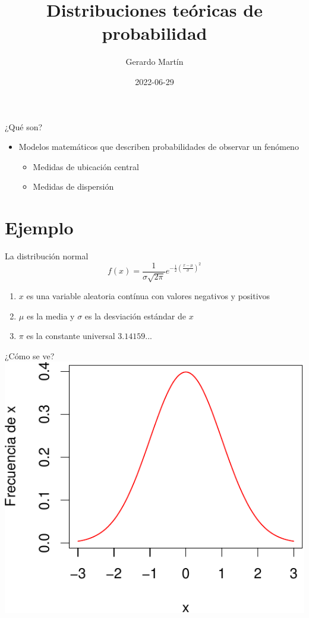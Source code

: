 \documentclass[
  11pt,
  ignorenonframetext,
]{beamer}
\title{Distribuciones teóricas de probabilidad}
\author{Gerardo Martín}
\date{2022-06-29}
\providecommand{\tightlist}{%
  \setlength{\itemsep}{0pt}\setlength{\parskip}{0pt}}
\begin{document}
\frame{\titlepage}

\begin{frame}{¿Qué son?}
\protect\hypertarget{quuxe9-son}{}
\begin{itemize}
\item
  Modelos matemáticos que describen probabilidades de observar un
  fenómeno

  \begin{itemize}
  \tightlist
  \item
    Medidas de ubicación central
  \item
    Medidas de dispersión
  \end{itemize}
\end{itemize}
\end{frame}

\hypertarget{ejemplo}{%
\section{Ejemplo}\label{ejemplo}}

\begin{frame}{La distribución normal}
\protect\hypertarget{la-distribuciuxf3n-normal}{}
\begin{equation}
f(x) = \frac{1}{\sigma \sqrt{2 \pi}} e^{ - \frac{1}{2} \left(\frac{x-\mu}{\sigma} \right)^2 }
\end{equation}

\begin{enumerate}
\tightlist
\item
  \(x\) es una variable aleatoria contínua con valores negativos y
  positivos
\item
  \(\mu\) es la media y \(\sigma\) es la desviación estándar de \(x\)
\item
  \(\pi\) es la constante universal \(3.14159...\)
\end{enumerate}
\end{frame}

\begin{frame}{¿Cómo se ve?}
\protect\hypertarget{cuxf3mo-se-ve}{}
\includegraphics{Distribuciones_files/figure-beamer/unnamed-chunk-1-1.pdf}
\end{frame}
\end{document}
